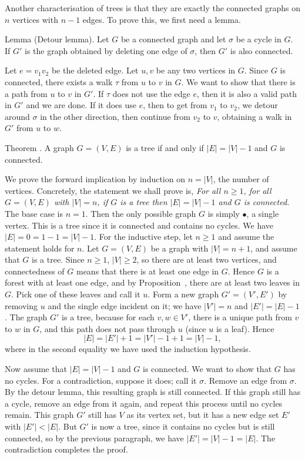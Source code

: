 Another characterisation of trees is that they are exactly the connected graphs on $n$ vertices
with $n-1$ edges. To prove this, we first need a lemma.

\parenproclaim{}
Lemma {\advthm} (Detour lemma). Let $G$ be a connected graph and let
$\sigma$ be a cycle in $G$. If $G'$ is the graph obtained by deleting one edge
of $\sigma$, then $G'$ is also connected.

\proof Let $e = v_1v_2$ be the deleted edge. Let $u,v$ be any two vertices in $G$.
Since $G$ is connected, there exists a walk $\tau$ from $u$ to $v$ in $G$.
We want to show that there is a path from $u$ to $v$ in $G'$. If $\tau$ does not use
the edge $e$, then it is also a valid path in $G'$ and we are done. If it does use $e$,
then to get from $v_1$ to $v_2$,
we detour around $\sigma$ in the other direction, then continue from $v_2$ to $v$, obtaining
a walk in $G'$ from $u$ to $w$.\slug

\proclaim Theorem \advthm. A graph $G = (V,E)$ is a tree if and only if
$|E| = |V|-1$ and $G$ is connected.

\proof We prove the forward implication by induction on $n=|V|$, the number of vertices.
Concretely, the statement we shall prove is, {\sl For all $n\ge 1$, for all $G=(V,E)$ with
$|V| = n$, if $G$ is a tree then $|E| = |V|-1$ and $G$ is connected.}
The base case is $n=1$. Then the only possible graph $G$ is simply $\bullet$, a single vertex.
This is a tree since it is connected and contains no cycles. We have $|E| = 0 = 1-1 = |V|-1$.
For the inductive step, let $n\ge 1$ and assume the statement holds for $n$. Let $G = (V,E)$
be a graph with $|V| = n+1$, and assume that $G$ is a tree. Since $n\ge 1$,
$|V| \ge 2$, so there are at least two vertices, and connectedness of $G$ means that there
is at least one edge in $G$. Hence $G$ is a forest with at least one edge, and by
Proposition~{\proptwoleaves}, there are at least two leaves in $G$. Pick one of these leaves
and call it $u$. Form a new graph $G' = (V', E')$ by removing $u$ and the single edge
incident on it; we have $|V'| = n$ and $|E'| = |E|-1$. The graph $G'$ is a tree, because
for each $v,w\in V'$, there is a unique path from $v$ to $w$ in $G$, and this path
does not pass through $u$ (since $u$ is a leaf). Hence
$$ |E| = |E'| + 1  = |V'| - 1 + 1 = |V|-1,$$
where in the second equality we have used the induction hypothesis.

Now assume that $|E| = |V|-1$ and $G$ is connected. We want to show that $G$ has no cycles.
For a contradiction, suppose it does; call it $\sigma$. Remove an edge from $\sigma$. By
the detour lemma, this resulting graph is still connected. If this graph still has a cycle,
remove an edge from it again, and repeat this process until no cycles remain. This graph
$G'$ still has $V$ as its vertex set, but it has a new edge set $E'$ with $|E'|< |E|$.
But $G'$ is now a tree, since it contains no cycles but is still connected, so by
the previous paragraph, we have $|E'| = |V|-1 = |E|$. The contradiction completes the proof.\slug

